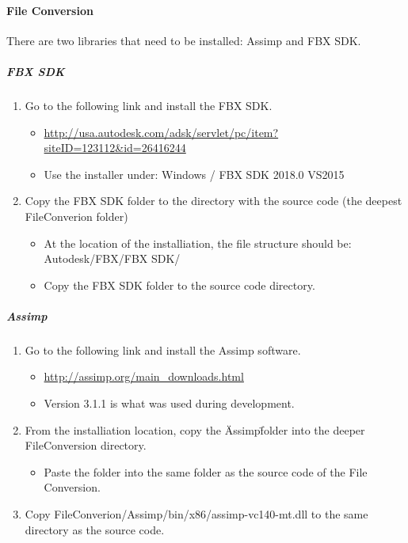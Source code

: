 \paragraph{File Conversion}

There are two libraries that need to be installed: Assimp and FBX SDK.

\subparagraph{FBX SDK}

\begin{enumerate}
    \item Go to the following link and install the FBX SDK.
    \begin{itemize}
        \item \url{http://usa.autodesk.com/adsk/servlet/pc/item?siteID=123112&id=26416244}
        \item Use the installer under: Windows / FBX SDK 2018.0 VS2015
    \end{itemize}

    \item Copy the FBX SDK folder to the directory with the source code (the deepest FileConverion folder)
    \begin{itemize}
        \item At the location of the installiation, the file structure should be: Autodesk/FBX/FBX SDK/
        \item Copy the FBX SDK folder to the source code directory.
    \end{itemize}
\end{enumerate}

\subparagraph{Assimp}

\begin{enumerate}
    \item Go to the following link and install the Assimp software.
    \begin{itemize}
        \item \url{http://assimp.org/main_downloads.html}
        \item Version 3.1.1 is what was used during development.
    \end{itemize}

    \item From the installiation location, copy the \"Assimp\" folder into the deeper FileConversion directory.
    \begin{itemize}
        \item Paste the folder into the same folder as the source code of the File Conversion.
    \end{itemize}

    \item Copy FileConverion/Assimp/bin/x86/assimp-vc140-mt.dll to the same directory as the source code.
\end{enumerate}


